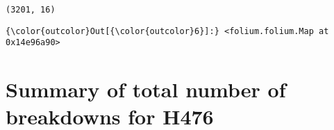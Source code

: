 \documentclass[11pt]{article}
\begin{document}
    \begin{Verbatim}[commandchars=\\\{\}]
(3201, 16)

    \end{Verbatim}

\begin{Verbatim}[commandchars=\\\{\}]
{\color{outcolor}Out[{\color{outcolor}6}]:} <folium.folium.Map at 0x14e96a90>
\end{Verbatim}
            
    \section{Summary of total number of breakdowns for
H476}\label{summary-of-total-number-of-breakdowns-for-h476}
\end{document}
